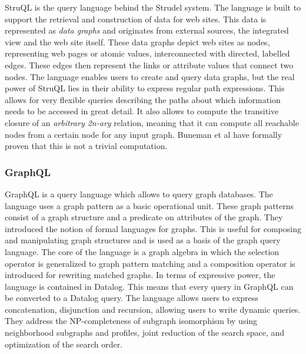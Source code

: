 StruQL is the query language behind the Strudel system\cite{Fernandez97aquery}. The language is built to support the retrieval and construction of data for web sites. This data is represented as \textit{data graphs} and originates from external sources, the integrated view and the web site itself. These data graphs depict web sites as nodes, representing web pages or atomic values, interconnected with directed, labelled edges. These edges then represent the links or attribute values that connect two nodes. The language enables users to create and query data graphs, but the real power of StruQL lies in their ability to express regular path expressions. This allows for very flexible queries describing the paths about which information needs to be accessed in great detail.
It also allows to compute the transitive closure of an \textit{arbitrary 2n-ary} relation, meaning that it can compute all reachable nodes from a certain node for any input graph. Buneman et al\cite{Buneman:1996} have formally proven that this is not a trivial computation.

\subsubsection*{GraphQL}

GraphQL\cite{He:2008} is a query language which allows to query graph databases. The language uses a graph pattern as a basic operational unit. These graph patterns consist of a graph structure and a predicate on attributes of the graph. They introduced the notion of formal languages for graphs. This is useful for composing and manipulating graph structures and is used as a basis of the graph query language.
The core of the language is a graph algebra in which the selection operator is generalized to graph pattern matching and a composition operator is introduced for rewriting matched graphs. In terms of expressive power, the language is contained in Datalog. This means that every query in GraphQL can be converted to a Datalog query. The language allows users to express concatenation, disjunction and recursion, allowing users to write dynamic queries. They address the NP-completeness of subgraph isomorphism by using neighborhood subgraphs and profiles, joint reduction of the search space, and optimization of the search order.

